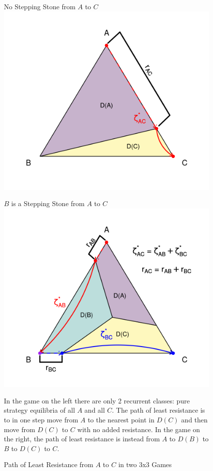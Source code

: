 \begin{figure}[h]
\captionsetup{justification=centering}
  \caption[caption]{Path of Least Resistance from $A$ to $C$ in two 3x3 Games}
   \label{fig:TreesTheory1}
\vskip12pt
\begin{minipage}[c]{.49\textwidth}
\centering
No Stepping Stone from $A$ to $C$
\vskip6pt
\includegraphics[width = \textwidth]{Images/Tree_1.png}
\end{minipage}
\begin{minipage}[c]{.49\textwidth}
\centering
$B$ is a Stepping Stone from $A$ to $C$
\vskip6pt
\includegraphics[width = \textwidth]{Images/Tree23.png}
\end{minipage}
\vskip12pt
\small
\centering
In the game on the left there are only 2 recurrent classes: pure strategy equilibria of all $A$ and all $C$. The path of least resistance is to in one step move from $A$ to the nearest point in $D(C)$ and then move from $D(C)$ to $C$ with no added resistance. In the game on the right, the path of least resistance is instead from $A$ to $D(B)$ to $B$ to $D(C)$ to $C$. 
\end{figure}
\justifying
\vskip12pt

